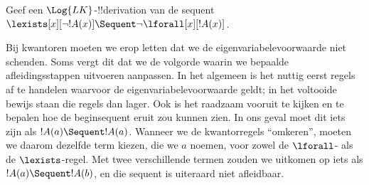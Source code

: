 \documentclass[openany]{memoir}
\begin{document}
\begingroup
\def\olfilename{OLP-0076}
\def\olfilepath{content/first-order-logic/sequent-calculus/}
\hypertarget{unit-OLP-0076}{}





\begin{ex}
Geef een $\Log{LK}$-!!{derivation} van de sequent
$\lexists[x][\lnot !A(x)] \Sequent \lnot \lforall[x][!A(x)]$.

Bij kwantoren moeten we erop letten dat we de
eigenvariabelevoorwaarde niet schenden. Soms vergt dit dat we de
volgorde waarin we bepaalde afleidingsstappen uitvoeren aanpassen. In
het algemeen is het nuttig eerst regels af te handelen waarvoor de
eigenvariabelevoorwaarde geldt; in het voltooide bewijs staan die
regels dan lager. Ook is het raadzaam vooruit te kijken en te bepalen
hoe de beginsequent eruit zou kunnen zien. In ons geval moet dit iets
zijn als $!A(a) \Sequent !A(a)$. Wanneer we de kwantorregels
``omkeren'', moeten we daarom dezelfde term kiezen, die we $a$ noemen,
voor zowel de $\lforall$- als de $\lexists$-regel. Met twee
verschillende termen zouden we uitkomen op iets als $!A(a) \Sequent
!A(b)$, en die sequent is uiteraard niet afleidbaar.


\end{ex}
\end{document}
